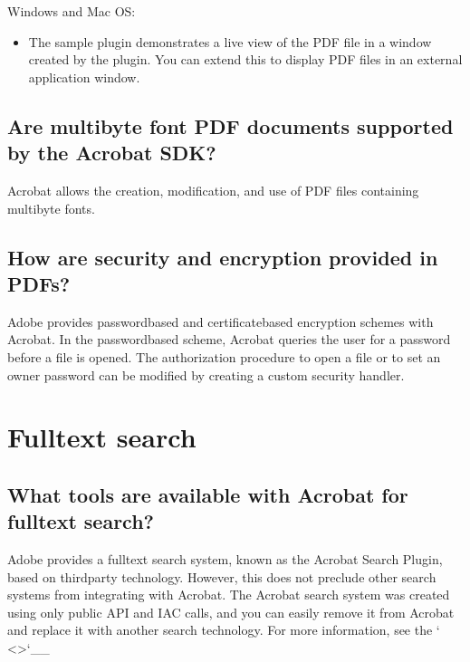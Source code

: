 \documentclass[letterpaper,12pt,english,openany,oneside]{sphinxmanual}
\begin{document}
Windows and Mac OS:
\begin{itemize}
\item {} 
The  sample plug\sphinxhyphen{}in demonstrates a live view of the PDF file in a window created by the plug\sphinxhyphen{}in. You can extend this to display PDF files in an external application window.

\end{itemize}


\subsection{Are multibyte font PDF documents supported by the Acrobat SDK?}
\label{\detokenize{apxDevFAQ:are-multibyte-font-pdf-documents-supported-by-the-acrobat-sdk}}
Acrobat allows the creation, modification, and use of PDF files containing multibyte fonts.


\subsection{How are security and encryption provided in PDFs?}
\label{\detokenize{apxDevFAQ:how-are-security-and-encryption-provided-in-pdfs}}
Adobe provides password\sphinxhyphen{}based and certificate\sphinxhyphen{}based encryption schemes with Acrobat. In the password\sphinxhyphen{}based scheme, Acrobat queries the user for a password before a file is opened. The authorization procedure to open a file or to set an owner password can be modified by creating a custom security handler.




\section{Full\sphinxhyphen{}text search}
\label{\detokenize{apxDevFAQ:full-text-search}}

\subsection{What tools are available with Acrobat for full\sphinxhyphen{}text search?}
\label{\detokenize{apxDevFAQ:what-tools-are-available-with-acrobat-for-full-text-search}}
Adobe provides a full\sphinxhyphen{}text search system, known as the Acrobat Search Plug\sphinxhyphen{}in, based on third\sphinxhyphen{}party technology. However, this does not preclude other search systems from integrating with Acrobat. The Acrobat search system was created using only public API and IAC calls, and you can easily remove it from Acrobat and replace it with another search technology. For more information, see the ` <>`\_\_  
\end{document}
